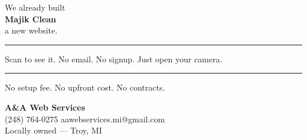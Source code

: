 \documentclass[11pt,letterpaper]{article}
\begin{document}
\begin{center}

\newcommand{\businessname}{Majik Clean}

\vspace*{0.1in}

{\fontsize{18}{22}\selectfont We already built}\\[0.1in]
{\fontsize{44}{48}\selectfont\bfseries \businessname}\\[0.1in]
{\fontsize{18}{22}\selectfont a new website.}

\vspace{0.3in}
\noindent\rule{\linewidth}{0.8pt}
\vspace{0.3in}

{\fontsize{15}{19}\selectfont Scan to see it. No email. No signup. Just open your camera.}

\vspace{0.35in}


\vspace{0.35in}
\noindent\rule{\linewidth}{0.8pt}
\vspace{0.3in}

{\fontsize{14}{18}\selectfont No setup fee. No upfront cost. No contracts.}

\vspace{0.3in}

{\fontsize{20}{24}\selectfont\bfseries A\&A Web Services}\\[0.15in]
{\fontsize{15}{19}\selectfont (248) 764-0275 \quad aawebservices.mi@gmail.com}\\[0.1in]
{\fontsize{12}{16}\selectfont Locally owned --- Troy, MI}

\vspace*{\fill}

\end{center}
\hfill{\color{gray!70}\fontsize{5}{6}}
\end{document}
